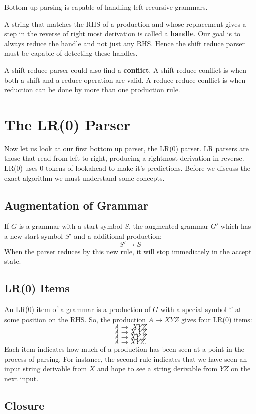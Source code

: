 \documentclass[12pt,letterpaper]{amsbook}
\theoremstyle{definition}
\begin{document}
Bottom up parsing is capable of handling left recursive grammars.

A string that matches the RHS of a production and whose replacement gives a step in the reverse of right most derivation is called a \textbf{handle}. Our goal is to always reduce the handle and not just any RHS. Hence the shift reduce parser must be capable of detecting these handles.

A shift reduce parser could also find a \textbf{conflict}. A shift-reduce conflict is when both a shift and a reduce operation are valid. A reduce-reduce conflict is when reduction can be done by more than one production rule.

\section{The LR(0) Parser}

Now let us look at our first bottom up parser, the LR(0) parser. LR parsers are those that read from left to right, producing a rightmost derivation in reverse. LR(0) uses 0 tokens of lookahead to make it's predictions. Before we discuss the exact algorithm we must understand some concepts.

\subsection{Augmentation of Grammar}

If $G$ is a grammar with a start symbol $S$, the augmented grammar $G'$ which has a new start symbol $S'$ and a additional production:
\[S' \rightarrow S\]
When the parser reduces by this new rule, it will stop immediately in the accept state.

\subsection{LR(0) Items}

An LR(0) item of a grammar is a production of $G$ with a special symbol `.' at some position on the RHS. So, the production $A \rightarrow XYZ$ gives four LR(0) items:
\[A \rightarrow .XYZ\]
\[A \rightarrow X.YZ\]
\[A \rightarrow XY.Z\]
\[A \rightarrow XYZ.\]
Each item indicates how much of a production has been seen at a point in the process of parsing. For instance, the second rule indicates that we have seen an input string derivable from $X$ and hope to see a string derivable from $YZ$ on the next input.

\subsection{Closure}
\end{document}
